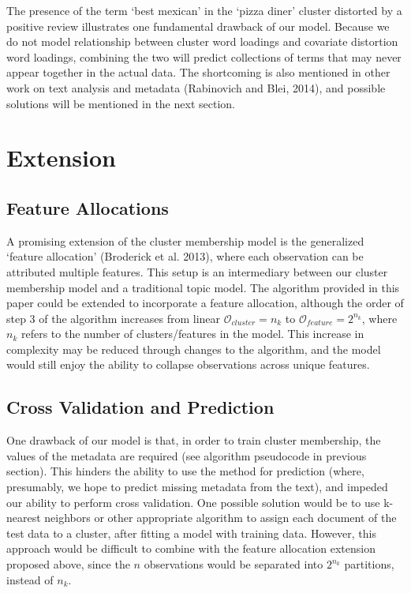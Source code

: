 \documentclass[12pt]{article}
\begin{document}
The presence of the term `best mexican' in the `pizza diner' cluster distorted by a positive review illustrates one fundamental drawback of our model. Because we do not model relationship between cluster word loadings and covariate distortion word loadings, combining the two will predict collections of terms that may never appear together in the actual data. The shortcoming is also mentioned in other work on text analysis and metadata (Rabinovich and Blei, 2014), and possible solutions will be mentioned in the next section.


\section{Extension}\label{extensions}

\subsection{Feature Allocations}
A promising extension of the cluster membership model is the generalized `feature allocation' (Broderick et al. 2013), where each observation can be attributed multiple features. This setup is an intermediary between our cluster membership model and a traditional topic model. 
The algorithm provided in this paper could be extended to incorporate a feature allocation, although the order of step 3 of the algorithm increases from linear $\mathcal{O}_{cluster} = n_k$ to $\mathcal{O}_{feature} = 2^{n_k}$, where $n_k$ refers to the number of clusters/features in the model. This increase in complexity may be reduced through changes to the algorithm, and the model would still enjoy the ability to collapse observations across unique features. 

\subsection{Cross Validation and Prediction}
One drawback of our model is that, in order to train cluster membership, the values of the metadata are required (see algorithm pseudocode in previous section). This hinders the ability to use the method for prediction (where, presumably, we hope to predict missing metadata from the text), and impeded our ability to perform cross validation. One possible solution would be to use k-nearest neighbors or other appropriate algorithm to assign each document of the test data to a cluster, after fitting a model with training data. However, this approach would be difficult to combine with the feature allocation extension proposed above, since the $n$ observations would be separated into $2^{n_k}$ partitions, instead of $n_k$. 
\end{document}
